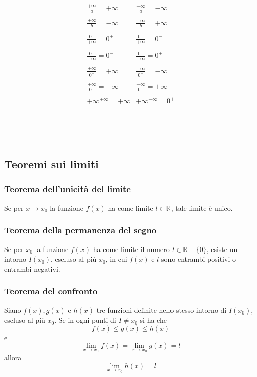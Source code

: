 \documentclass[a4paper,14pt]{extarticle}
\newcommand{\R}{\mathbb{R}}
\begin{document}
\[
\begin{array}{cc}
\frac{+\infty}{a} = + \infty & \frac{-\infty}{a} = - \infty\\ & \\
\frac{+\infty}{b} = - \infty & \frac{-\infty}{b} = + \infty\\ & \\
\frac{0^+}{+\infty} = 0^+ & \frac{0^-}{+\infty} = 0^-\\ & \\
\frac{0^+}{-\infty} = 0^- & \frac{0^-}{-\infty} = 0^+\\ & \\
\frac{+\infty}{0^+} = +\infty & \frac{-\infty}{0^+} = -\infty\\ & \\
\frac{+\infty}{0^-} = -\infty & \frac{-\infty}{0^-} = +\infty\\ & \\
+\infty^{+\infty} = +\infty & +\infty^{-\infty} = 0^+\\ & \\
& \\ & \\
& \\ & \\
& \\ & \\
& \\ & \\
& \\ & \\
\end{array}
\]

\normalsize
\subsection{Teoremi sui limiti}
\subsubsection{Teorema dell'unicità del limite}
Se per $x \to x_0$ la funzione $f(x)$ ha come limite $l \in \R$, tale limite è unico.
\subsubsection{Teorema della permanenza del segno}
Se per $x_0$ la funzione $f(x)$  ha come limite il numero $l \in \R-\{0\}$, esiste un intorno $I(x_0)$, escluso al più $x_0$, in cui  $f(x)$  e $l$ sono entrambi positivi o entrambi negativi.
\subsubsection{Teorema del confronto}
Siano $f(x), g(x)$ e $h(x)$ tre funzioni definite nello stesso intorno di $I(x_0)$, escluso al più $x_0$. Se in ogni punti di $I \ne x_0$ si ha che \[ f(x) \le g(x) \le h(x)\] e \[ \lim_{x \to x_0}f(x) = \lim_{x \to x_0}g(x) = l \] allora \[ \lim_{x \to x_0}h(x) = l\]
\end{document}

